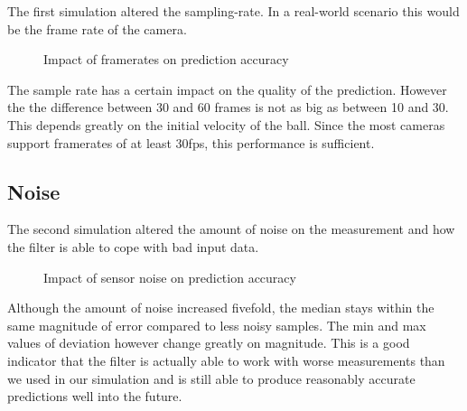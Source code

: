 \documentclass[notitlepage, a4paper, 11pt]{scrartcl}
\begin{document}
\begin{multicols}{2}
The first simulation altered the sampling-rate. In a real-world scenario this would be the frame rate of the camera.

\begin{figure}[H]
    \centering
    \caption{Impact of framerates on prediction accuracy}
    \label{fig:framerate10}
\end{figure}

The sample rate has a certain impact on the quality of the prediction. However the the difference between 30 and 60 frames is not as big as between 10 and 30. 
This depends greatly on the initial velocity of the ball. Since the most cameras support framerates of at least 30fps, this performance is sufficient.

\subsection{Noise}

The second simulation altered the amount of noise on the measurement and how the filter is able to cope with bad input data.

\begin{figure}[H]
    \centering
    \caption{Impact of sensor noise on prediction accuracy}
    \label{fig:noise2}
\end{figure}

Although the amount of noise increased fivefold, the median stays within the same magnitude of error compared to less noisy samples. The min and max values of deviation however change greatly on magnitude.
This is a good indicator that the filter is actually able to work with worse measurements than we used in our simulation and is still able to produce reasonably accurate predictions well into the future.


\end{multicols}
\end{document}
